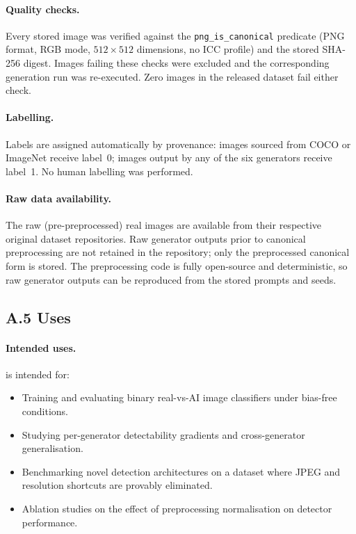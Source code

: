 \paragraph{Quality checks.}
Every stored image was verified against the \texttt{png\_is\_canonical}
predicate (PNG format, RGB mode, $512 \times 512$ dimensions, no ICC
profile) and the stored SHA-256 digest.
Images failing these checks were excluded and the corresponding
generation run was re-executed.
Zero images in the released dataset fail either check.

\paragraph{Labelling.}
Labels are assigned automatically by provenance: images sourced from
COCO or ImageNet receive label~0; images output by any of the six
generators receive label~1.
No human labelling was performed.

\paragraph{Raw data availability.}
The raw (pre-preprocessed) real images are available from their
respective original dataset repositories.
Raw generator outputs prior to canonical preprocessing are not
retained in the repository; only the preprocessed canonical form
is stored.
The preprocessing code is fully open-source and deterministic, so
raw generator outputs can be reproduced from the stored prompts
and seeds.

\subsection*{A.5 \quad Uses}
\label{ssec:ds_uses}

\paragraph{Intended uses.}
\textbf{\datasetname} is intended for:
\begin{itemize}[leftmargin=1.5em, itemsep=2pt]
  \item Training and evaluating binary real-vs-AI image classifiers
    under bias-free conditions.
  \item Studying per-generator detectability gradients and
    cross-generator generalisation.
  \item Benchmarking novel detection architectures on a dataset where
    JPEG and resolution shortcuts are provably eliminated.
  \item Ablation studies on the effect of preprocessing normalisation
    on detector performance.
\end{itemize}

